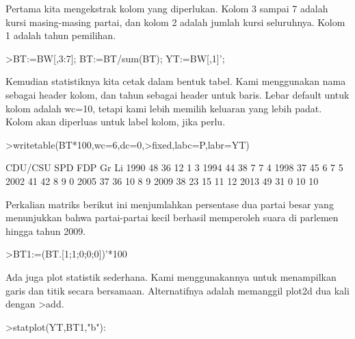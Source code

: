 \documentclass[a4paper,10pt]{article}
\begin{document}
\begin{eulernotebook}
\begin{eulercomment}
\begin{eulercomment}
\begin{eulercomment}
Pertama kita mengekstrak kolom yang diperlukan. Kolom 3 sampai 7
adalah kursi masing-masing partai, dan kolom 2 adalah jumlah kursi
seluruhnya. Kolom 1 adalah tahun pemilihan.
\end{eulercomment}
\begin{eulerprompt}
>BT:=BW[,3:7]; BT:=BT/sum(BT); YT:=BW[,1]';
\end{eulerprompt}
\begin{eulercomment}
Kemudian statistiknya kita cetak dalam bentuk tabel. Kami menggunakan
nama sebagai header kolom, dan tahun sebagai header untuk baris. Lebar
default untuk kolom adalah wc=10, tetapi kami lebih memilih keluaran
yang lebih padat. Kolom akan diperluas untuk label kolom, jika perlu.
\end{eulercomment}
\begin{eulerprompt}
>writetable(BT*100,wc=6,dc=0,>fixed,labc=P,labr=YT)
\end{eulerprompt}
\begin{euleroutput}
         CDU/CSU   SPD   FDP    Gr    Li
    1990      48    36    12     1     3
    1994      44    38     7     7     4
    1998      37    45     6     7     5
    2002      41    42     8     9     0
    2005      37    36    10     8     9
    2009      38    23    15    11    12
    2013      49    31     0    10    10
\end{euleroutput}
\begin{eulercomment}
Perkalian matriks berikut ini menjumlahkan persentase dua partai besar
yang menunjukkan bahwa partai-partai kecil berhasil memperoleh suara
di parlemen hingga tahun 2009.
\end{eulercomment}
\begin{eulerprompt}
>BT1:=(BT.[1;1;0;0;0])'*100
\end{eulerprompt}
\begin{euleroutput}
  [84.29,  81.25,  81.1659,  82.7529,  72.9642,  61.8971,  79.8732]
\end{euleroutput}
\begin{eulercomment}
Ada juga plot statistik sederhana. Kami menggunakannya untuk
menampilkan garis dan titik secara bersamaan. Alternatifnya adalah
memanggil plot2d dua kali dengan \textgreater{}add.
\end{eulercomment}
\begin{eulerprompt}
>statplot(YT,BT1,"b"):
\end{eulerprompt}
\begin{eulercomment}

\end{eulercomment}
\end{eulercomment}
\end{eulercomment}
\end{eulernotebook}
\end{document}
